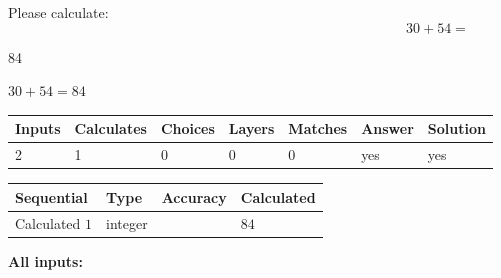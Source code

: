 \documentclass[12pt]{article}
\begin{document}
Please calculate:
\begin{equation}
30 +  %
54 = \nonumber
\end{equation}
 
 
 
\noindent{}
 
 

84
 
 
\noindent{}
 
 

 
 
 
\noindent{}
 
 

$ %
30 +  %
54=   %
84$
 
 
\noindent{}
 
 

 
   
   
   
   
\noindent\begin{tabular}{|l|l|l|l|l|l|l|}
 \hline
Inputs & Calculates & Choices & Layers & Matches & Answer & Solution \\ \hline
 2  & 
 1  & 
 0
  & 
 0  & 
 0  & 
  yes & 
  yes 
  \\ \hline
 \end{tabular}
   
   
   
   
\noindent{}
   
   
  
  
\noindent\begin{tabular}{|l|l|l|l|}
\hline
 Sequential & Type & Accuracy & Calculated \\ 
\hline
 
 
  Calculated $  1 $ & integer &  & 
  $ 84 $ 
 \\  \hline  
 \end{tabular}
   
   
   
   
\noindent\vspace{0.1in}\hspace{-0.08in} {\textbf{\Large{All inputs: }}}
   
   
  
\end{document}

